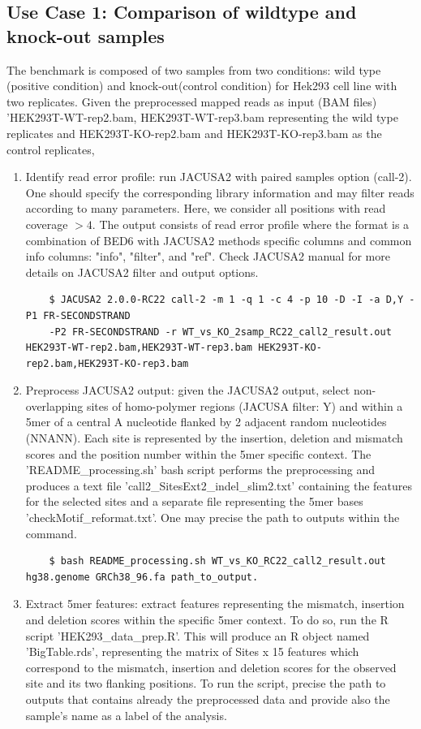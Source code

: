 \documentclass[times, 11pt, a4paper]{article}
\begin{document}
\subsection*{Use Case 1: Comparison of wildtype and knock-out samples}
The benchmark is composed of two samples from two conditions: wild type (positive condition) and knock-out(control condition) for Hek293 cell line with two replicates. 
Given the preprocessed mapped reads as input (BAM files) 'HEK293T-WT-rep2.bam, HEK293T-WT-rep3.bam representing the wild type replicates and HEK293T-KO-rep2.bam and  HEK293T-KO-rep3.bam as the control replicates, 
\begin{enumerate} 
	\item Identify read error profile: run JACUSA2 with paired samples option (call-2). One should specify the corresponding library information and may filter reads according to many parameters. Here, we consider all positions with read coverage $> 4$. The output consists of read error profile where the format is a combination of BED6 with JACUSA2 methods specific columns and common info columns: "info", "filter", and "ref". Check JACUSA2 manual for more details on JACUSA2 filter and output options.
	\begin{verbatim}
	$ JACUSA2 2.0.0-RC22 call-2 -m 1 -q 1 -c 4 -p 10 -D -I -a D,Y -P1 FR-SECONDSTRAND
	-P2 FR-SECONDSTRAND -r WT_vs_KO_2samp_RC22_call2_result.out HEK293T-WT-rep2.bam,HEK293T-WT-rep3.bam	HEK293T-KO-rep2.bam,HEK293T-KO-rep3.bam
	\end{verbatim}
	\item Preprocess JACUSA2 output: given the JACUSA2 output, select non-overlapping sites of homo-polymer regions (JACUSA filter: Y) and within a 5mer of a central A nucleotide flanked by 2 adjacent random nucleotides (NNANN). Each site is represented by the insertion, deletion and mismatch scores and the position number within the 5mer specific context. The 'README\_processing.sh' bash script performs the preprocessing and produces a text file 'call2\_SitesExt2\_indel\_slim2.txt' containing the features for the selected sites and a separate file representing the 5mer bases 'checkMotif\_reformat.txt'. One may precise the path to outputs within the command.
	\begin{verbatim} 
	$ bash README_processing.sh WT_vs_KO_RC22_call2_result.out hg38.genome GRCh38_96.fa path_to_output.
	\end{verbatim}
	\item Extract 5mer features: extract features representing the mismatch, insertion and deletion scores within the specific 5mer context. To do so, run the R script 'HEK293\_data\_prep.R'. This will produce an R object named 'BigTable.rds', representing the matrix of Sites x 15 features which correspond to the mismatch, insertion and deletion scores for the observed site and its two flanking positions. To run the script, precise the path to outputs that contains already the preprocessed data and provide also the sample's name as a label of the analysis.

\end{enumerate}
\end{document}
